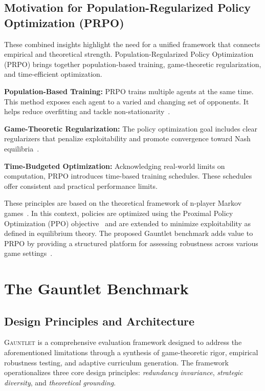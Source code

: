 \documentclass[sigconf,anonymous]{aamas}
\begin{document}
\subsection{Motivation for Population-Regularized Policy Optimization (PRPO)}

These combined insights highlight the need for a unified framework that connects empirical and theoretical strength. Population-Regularized Policy Optimization (PRPO) brings together population-based training, game-theoretic regularization, and time-efficient optimization.

\textbf{Population-Based Training:} PRPO trains multiple agents at the same time. This method exposes each agent to a varied and changing set of opponents. It helps reduce overfitting and tackle non-stationarity~\cite{Vinyals2019,OpenAI2019}.

\textbf{Game-Theoretic Regularization:} The policy optimization goal includes clear regularizers that penalize exploitability and promote convergence toward Nash equilibria~\cite{Brown2020,Lockhart2019,Zhang2023ModelBased}.

\textbf{Time-Budgeted Optimization:} Acknowledging real-world limits on computation, PRPO introduces time-based training schedules. These schedules offer consistent and practical performance limits.

These principles are based on the theoretical framework of n-player Markov games~\cite{Littman1994}. In this context, policies are optimized using the Proximal Policy Optimization (PPO) objective~\cite{Hu2023} and are extended to minimize exploitability as defined in equilibrium theory. The proposed Gauntlet benchmark adds value to PRPO by providing a structured platform for assessing robustness across various game settings~\cite{Lanctot2019OpenSpielOS,Ellis2023,Cui2023}.


\section{The Gauntlet Benchmark}

\subsection{Design Principles and Architecture}

\textsc{Gauntlet} is a comprehensive evaluation framework designed to address the aforementioned limitations through a synthesis of game-theoretic rigor, empirical robustness testing, and adaptive curriculum generation. The framework operationalizes three core design principles: \emph{redundancy invariance}, \emph{strategic diversity}, and \emph{theoretical grounding}.
\end{document}
